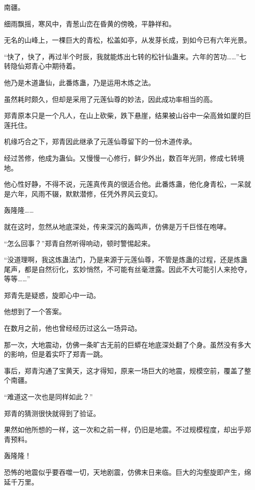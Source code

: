 
\begin{this_body}

南疆。

细雨飘摇，寒风中，青葱山峦在昏黄的傍晚，平静祥和。

无名的山峰上，一棵巨大的青松，松盖如亭，从发芽长成，到如今已有六年光景。

“快了，快了，再过半个时辰，我就能炼出七转的松针仙蛊来。六年的苦功……”七转隐仙郑青心中期待着。

他乃是木道蛊仙，此番炼蛊，乃是运用木炼之法。

虽然耗时颇久，但却是采用了元莲仙尊的妙法，因此成功率相当的高。

郑青原本只是一个凡人，在山上砍柴，跌下悬崖，结果被山谷中一朵高耸如厦的巨莲托住。

机缘巧合之下，郑青因此继承了元莲仙尊留下的一份木道传承。

经过苦修，他成为蛊仙。又慢慢一心修行，鲜少外出，数百年光阴，修成七转境地。

他心性好静，不得不说，元莲真传真的很适合他。此番炼蛊，他化身青松，一呆就是六年，风雨不辍，默默潜修，任凭外界风云变幻。

轰隆隆……

就在这时，忽然从地底深处，传来深沉的轰鸣声，仿佛是万千巨怪在咆哮。

“怎么回事？”郑青自然听得响动，顿时警惕起来。

“没道理啊，我这炼蛊法门，乃是来源于元莲仙尊，不管是炼蛊的过程，还是炼蛊尾声，都是自然衍化，玄妙悄然，不可能有丝毫泄露。因此不大可能引人来抢夺，等等……”

郑青先是疑惑，旋即心中一动。

他想到了一个答案。

在数月之前，他也曾经经历过这么一场异动。

那一次，大地震动，仿佛一条旷古无前的巨蟒在地底深处翻了个身。虽然没有多大的影响，但是着实吓了郑青一跳。

事后，郑青沟通了宝黄天，这才得知，原来一场巨大的地震，规模空前，覆盖了整个南疆。

“难道这一次也是同样如此？”

郑青的猜测很快就得到了验证。

果然如他所想的一样，这一次和之前一样，仍旧是地震。不过规模程度，却出乎郑青预料。

轰隆隆！

恐怖的地震似乎要吞噬一切，天地剧震，仿佛末日来临。巨大的沟壑旋即产生，绵延千万里。


\end{this_body}
